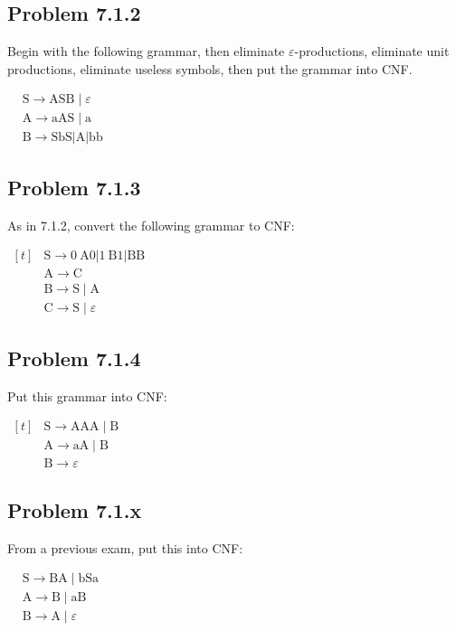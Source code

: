 \documentclass[12pt]{scrbook}
\begin{document}
\newpage \subsection*{Problem 7.1.2}Begin with the following grammar, then
eliminate $\varepsilon$-productions, eliminate unit productions, eliminate
useless symbols, then put the grammar into CNF.

$ \begin{aligned}
& \mathrm{S} \rightarrow \mathrm{ASB} \mid \varepsilon \\
& \mathrm{A} \rightarrow \mathrm{aAS} \mid \mathrm{a} \\
& \mathrm{B} \rightarrow \mathrm{SbS}|\mathrm{A}| \mathrm{bb}
\end{aligned} $

\subsection*{Problem 7.1.3}As in 7.1.2, convert the following grammar to CNF:

$ \begin{aligned}[t]
& \mathrm{S} \rightarrow 0 \mathrm{~A} 0|1 \mathrm{~B} 1| \mathrm{BB} \\
& \mathrm{A} \rightarrow \mathrm{C} \\
& \mathrm{B} \rightarrow \mathrm{S} \mid \mathrm{A} \\
& \mathrm{C} \rightarrow \mathrm{S} \mid \varepsilon
\end{aligned} $

\subsection*{Problem 7.1.4}Put this grammar into CNF:

$\begin{aligned}[t]
& \mathrm{S} \rightarrow \mathrm{AAA} \mid \mathrm{B} \\
& \mathrm{A} \rightarrow \mathrm{aA} \mid \mathrm{B} \\
& \mathrm{B} \rightarrow \varepsilon
\end{aligned}$

\subsection*{Problem 7.1.x}From a previous exam, put this into CNF:

$\begin{aligned}
& \mathrm{S} \rightarrow \mathrm{BA} \mid \mathrm{bSa} \\
& \mathrm{A} \rightarrow \mathrm{B} \mid \mathrm{aB} \\
& \mathrm{B} \rightarrow \mathrm{A} \mid \varepsilon
\end{aligned}$
\end{document}
